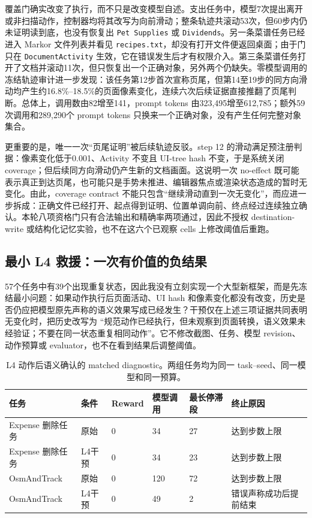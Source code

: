 \documentclass[12pt,a4paper]{ctexart}
\newcommand{\code}[1]{\texttt{#1}}
\begin{document}
覆盖门确实改变了执行，而不只是改变模型自述。支出任务中，模型7次提出离开或非扫描动作，控制器均将其改写为向前滑动；整条轨迹共滚动53次，但60步内仍未证明读到底，也没有恢复出 \code{Pet Supplies} 或 \code{Dividends}。另一条菜谱任务已经进入 Markor 文件列表并看见 \code{recipes.txt}，却没有打开文件便返回桌面；由于门只在 \code{DocumentActivity} 生效，它在错误发生后才有权限介入。第三条菜谱任务打开了文档并滚动11次，但只恢复出一个正确对象，另外两个仍缺失。零模型调用的冻结轨迹审计进一步发现：该任务第12步首次宣称页尾，但第14至19步的同方向滑动均产生约16.8\%--18.5\%的页面像素变化，连续六次后续证据直接推翻了页尾判断。总体上，调用数由82增至141，prompt tokens 由323,495增至612,785；额外59次调用和289,290个 prompt tokens 只换来一个正确对象，没有产生任何完整对象集合。

更重要的是，唯一一次“页尾证明”被后续轨迹反驳。step 12 的滑动满足预注册判据：像素变化低于0.001、Activity 不变且 UI-tree hash 不变，于是系统关闭 coverage；但后续同方向滑动仍产生新的文档画面。这说明一次 no-effect 既可能表示真正到达页尾，也可能只是手势未推进、编辑器焦点或渲染状态造成的暂时无变化。由此，coverage contract 不能只包含“继续滑动直到一次无变化”，而应进一步拆成：正确文件已经打开、起点得到证明、位置单调向前、终点经过连续独立确认。本轮八项资格门只有合法输出和精确率两项通过，因此不授权 destination-write 或结构化记忆实验，也不在这六个已观察 cells 上修改阈值后重跑。

\subsection{最小 L4 救援：一次有价值的负结果}

57个任务中有39个出现重复状态，因此我没有立刻实现一个大型新框架，而是先冻结最小问题：如果动作执行后页面活动、UI hash 和像素变化都没有改变，历史是否仍应把模型原先声称的语义效果写成已经发生？干预仅在上述三项证据共同表明无变化时，把历史改写为 ``规范动作已经执行，但未观察到页面转换，语义效果未经验证；不要在同一状态重复相同动作''。它不修改截图、任务、模型 revision、动作预算或 evaluator，也不在看到结果后调整阈值。

\begin{table}[H]
    \centering
    \caption{L4 动作后语义确认的 matched diagnostic。两组任务均为同一 task--seed、同一模型和同一预算。}
    \label{tab:l4-attestation}
    \scriptsize
    \begin{tabularx}{\textwidth}{p{2.2cm}p{1.7cm}p{1.5cm}p{1.8cm}p{2.0cm}Y}
        \toprule
        任务 & 条件 & Reward & 模型调用 & 最长停滞段 & 终止原因 \\
        \midrule
        Expense 删除任务 & 原始 & 0 & 34 & 27 & 达到步数上限 \\
        Expense 删除任务 & L4干预 & 0 & 34 & 23 & 达到步数上限 \\
        OsmAndTrack & 原始 & 0 & 120 & 72 & 达到步数上限 \\
        OsmAndTrack & L4干预 & 0 & 49 & 2 & 错误声称成功后提前结束 \\
        \bottomrule
    \end{tabularx}
\end{table}
\end{document}
